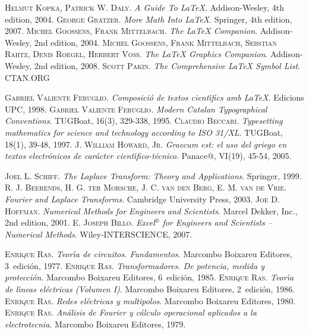 \begin{thebibliography}{99}


     \textsc{Helmut Kopka, Patrick W. Daly}. \textsl{A Guide To \LaTeX}.  Addison-Wesley, 4th edition, 2004.
     \textsc{George Gr\"{a}tzer}. \textsl{More Math Into \LaTeX}.  Springer, 4th edition, 2007.
     \textsc{Michel Goossens, Frank Mittelbach}. \textsl{The \LaTeX{} Companion}.  Addison-Wesley, 2nd edition, 2004.
     \textsc{Michel Goossens, Frank Mittelbach, Sebstian Rahtz, Denis Roegel, Herbert Vo{\ss}}. \textsl{The \LaTeX{} Graphics Companion}.  Addison-Wesley, 2nd edition, 2008.
     \textsc{Scott Pakin}. \textsl{The Comprehensive \LaTeX{} Symbol List}. CTAN.ORG

     \textsc{Gabriel Valiente Feruglio}. \textsl{Composici\'{o} de textos cient\'{\i}fics amb \LaTeX}.  Edicions UPC, 1998.
     \textsc{Gabriel Valiente Feruglio}. \textsl{Modern Catalan Typographical Conventions}.  TUGBoat, 16(3), 329-338, 1995.
     \textsc{Claudio Beccari}. \textsl{Typesetting mathematics for science and technology according to ISO 31/XL}.  TUGBoat, 18(1), 39-48, 1997.
     \textsc{J. William Howard, Jr}. \textsl{Graecum est: el uso del griego en textos electr\'{o}nicos de car\'{a}cter cient\'{\i}fico-t\'{e}cnico}.  Panace@, VI(19), 45-54, 2005.


     \textsc{Joel L. Schiff}. \textsl{The Laplace Transform: Theory and Applications}.  Springer, 1999.
     \textsc{R. J. Beerends, H. G. ter Morsche, J. C. van den Berg, E. M. van de Vrie}. \textsl{Fourier and Laplace Transforms}.  Cambridge University Press, 2003.
     \textsc{Joe D. Hoffman}. \textsl{Numerical Methods for Engineers and Scientists}.  Marcel Dekker, Inc., 2nd edition, 2001.
     \textsc{E. Joseph Billo}. \textsl{Excel${}^\circledR$ for Engineers and Scientists -- Numerical Methods}.  Wiley-INTERSCIENCE, 2007.


     \textsc{Enrique Ras}. \textsl{Teor\'{\i}a de circuitos. Fundamentos}.  Marcombo Boixareu Editores, 3\textordfeminine\ edici\'{o}n, 1977.
     \textsc{Enrique Ras}. \textsl{Transformadores. De potencia, medida y protecci\'{o}n}.  Marcombo Boixareu Editores, 6\textordfeminine\ edici\'{o}n, 1985.
     \textsc{Enrique Ras}. \textsl{Teor\'{\i}a de l\'{\i}neas el\'{e}ctricas (Volumen I)}.  Marcombo Boixareu Editores, 2\textordfeminine\ edici\'{o}n, 1986.
     \textsc{Enrique Ras}. \textsl{Redes el\'{e}ctricas y multipolos}.  Marcombo Boixareu Editores, 1980.
     \textsc{Enrique Ras}. \textsl{An\'{a}lisis de Fourier y c\'{a}lculo operacional aplicados a la electrotecnia}.  Marcombo Boixareu Editores, 1979.


\end{thebibliography}
